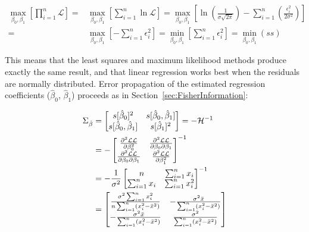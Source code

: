 \begin{equation}
\begin{split}
\underset{\beta_0,\beta_1}{\max}\left[\prod_{i=1}^n \mathcal{L}\right] = &
\underset{\beta_0,\beta_1}{\max}\left[\sum_{i=1}^n \ln\mathcal{L}\right] =
\underset{\beta_0,\beta_1}{\max}\left[\ln\!\left(\frac{1}{\sigma\sqrt{2\pi}}\right)-\sum_{i=1}^n\left(\frac{\epsilon_i^2}{2\sigma^2}\right)\right] \\
= & \underset{\beta_0,\beta_1}{\max}\left[-\sum_{i=1}^n\epsilon_i^2\right] = 
\underset{\beta_0,\beta_1}{\min}\left[\sum_{i=1}^{n} \epsilon_i^2\right] = \underset{\beta_0,\beta_1}{\min}(ss)
\end{split}
\end{equation}

This means that the least squares and maximum likelihood methods
produce exactly the same result, and that linear regression works best
when the residuals are normally distributed. Error propagation of the
estimated regression coefficients ($\hat{\beta}_0$, $\hat{\beta}_1$)
proceeds as in Section~\ref{sec:FisherInformation}:

\begin{equation}
  \begin{split}
    \Sigma_{\hat{\beta}} & = 
  \left[
    \begin{array}{@{}cc@{}}
      s[\hat{\beta}_0]^2 & s[\hat{\beta}_0,\hat{\beta}_1] \\
      s[\hat{\beta}_0,\hat{\beta}_1] & s[\hat{\beta}_1]^2 \\
    \end{array}
    \right] = 
  -\mathcal{H}^{-1} \\
  & =
    -\left[
      \begin{array}{@{}cc@{}}
        \frac{\partial^2{\mathcal{LL}}}{\partial{\beta_0^2}} &
        \frac{\partial^2{\mathcal{LL}}}{\partial{\beta_0}\partial{\beta_1}} \\
        \frac{\partial^2{\mathcal{LL}}}{\partial{\beta_0}\partial{\beta_1}} &
        \frac{\partial^2{\mathcal{LL}}}{\partial{\beta_1^2}}
      \end{array}
      \right]^{-1} \\
    & = -\frac{1}{\sigma^2}
    \left[
      \begin{array}{@{}cc@{}}
        n & \sum_{i=1}^{n}x_i \\
        \sum_{i=1}^{n}x_i & \sum_{i=1}^{n}x_i^2
      \end{array}
      \right]^{-1} \\
    & =
    \left[
      \begin{array}{@{}cc@{}}
        \frac{\sigma^2\sum_{i=1}^{n}x_i^2}{n\sum_{i=1}^{n}(x_i^2-\bar{x}^2)} &
        -\frac{\sigma^2\bar{x}}{\sum_{i=1}^{n}(x_i^2-\bar{x}^2)} \\
        -\frac{\sigma^2\bar{x}}{\sum_{i=1}^{n}(x_i^2-\bar{x}^2)} &
        \frac{\sigma^2}{\sum_{i=1}^{n}(x_i^2-\bar{x}^2)}
      \end{array}
      \right]
  \end{split}
  \label{eq:sigmabeta}
\end{equation}

